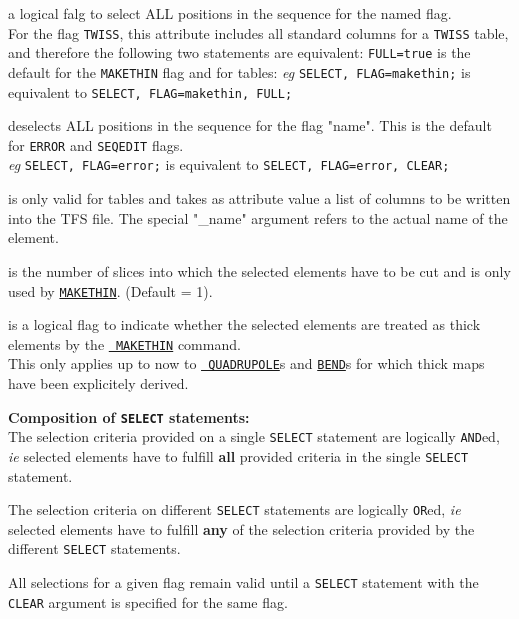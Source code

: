 \begin{madlist}
   a logical falg to select ALL positions in the sequence
  for the named flag. \\
  For the flag {\tt TWISS}, this attribute includes all standard
  columns for a {\tt TWISS} table, and therefore the following two
  statements are equivalent:
  {\tt FULL=true} is the default for the {\tt MAKETHIN} flag and for tables: 
  {\sl eg} {\tt SELECT, FLAG=makethin;} is equivalent to {\tt SELECT,
    FLAG=makethin, FULL;}  
  
   deselects ALL positions in the sequence for the flag
  "name". This is the default for {\tt ERROR} and {\tt SEQEDIT}
  flags. \\
  {\sl eg} {\tt SELECT, FLAG=error;} is equivalent to {\tt SELECT, FLAG=error, CLEAR;}

   is only valid for tables and takes as attribute value
  a list of columns to be written into the TFS file. The special "\_name"
  argument refers to the actual name of the element. 

   is the number of slices into which the selected
  elements have to be cut and is only used by
  \hyperref[chap:makethin]{\tt MAKETHIN}. (Default = 1). 

   is a logical flag to indicate  whether the selected
  elements are treated as thick elements by the \hyperref[chap:makethin]{\tt
    MAKETHIN} command. \\ 
  This only applies up to now to \hyperref[sec:quadrupole]{\tt
    QUADRUPOLE}s and \hyperref[sec:bend]{\tt BEND}s for which thick maps
  have been explicitely derived. 
\end{madlist}

\vskip 5mm
{\bf Composition of {\tt SELECT} statements:} \\
The selection criteria provided on a single {\tt SELECT} statement are logically
{\tt AND}ed, {\sl ie} selected elements have to fulfill {\bf all}
provided criteria in the single {\tt SELECT} statement.  

The selection criteria on different {\tt SELECT} statements are logically
{\tt OR}ed, {\sl ie} selected elements have to fulfill {\bf any} of the
selection criteria provided by the different {\tt SELECT} statements.   

All selections for a given flag remain valid until a {\tt SELECT} statement
with the {\tt CLEAR} argument is specified for the same flag.

